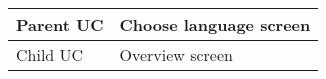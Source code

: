 \begin{table}[]
\begin{tabular}{|l|l|}
Parent UC        & Choose language screen                                                                                                                                                                                                                           \\ \hline
Child UC         & Overview screen                                                                                                                                                                                                                                  \\ \hline
\end{tabular}
\end{table}







